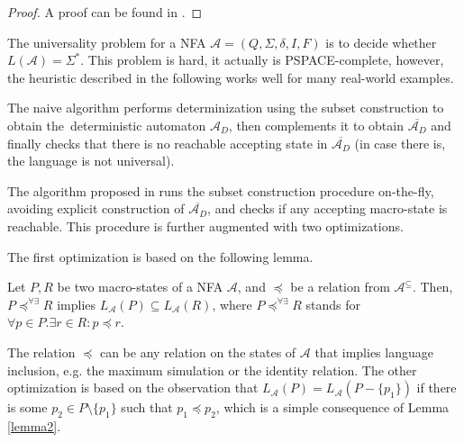 \begin{proof}
A proof can be found in \cite{tacas}.
\end{proof}

The universality problem for a NFA $\mathcal{A} = (Q, \Sigma, \delta, I, F)$ is
to decide whether $L(\mathcal{A}) = \Sigma^*$. This problem is hard, it actually
is PSPACE-complete, however, the heuristic described in the following works well
for many real-world examples.

The naive algorithm performs determinization using the subset construction to
obtain the~deterministic automaton $\mathcal{A}_D$, then complements it to
obtain $\overline{\mathcal{A}_D}$ and finally checks that there is no reachable
accepting state in $\overline{\mathcal{A}_D}$ (in case there is, the language
is not universal).

The algorithm proposed in \cite{tacas} runs the subset construction procedure
on-the-fly, avoiding explicit construction of $\overline{\mathcal{A}_D}$, and
checks if any accepting macro-state is reachable. This procedure is
further augmented with two optimizations.

The first optimization is based on the following lemma.

\begin{lemma}\label{lemma2}
 Let $P, R$ be two macro-states of a NFA $\mathcal{A}$, and $\preceq$ be a
 relation from $\mathcal{A}^\subseteq$. Then, $P \preceq^{\forall\exists} R$
 implies $L_\mathcal{A}(P) \subseteq L_\mathcal{A}(R)$, where $P
 \preceq^{\forall\exists} R$ stands for $\forall p \in P. \exists r\in R : p
 \preceq r$.
\end{lemma}

The relation $\preceq$ can be any relation on the states of $\mathcal{A}$ that
implies language inclusion, e.g. the maximum simulation or the identity
relation. The other optimization is based on the observation that
$L_\mathcal{A}(P) = L_\mathcal{A}(P - \{p_1\})$ if there is some $p_2 \in P \setminus \{p_1\}$ such
that $p_1 \preceq p_2$, which is a simple consequence of Lemma \ref{lemma2}.

